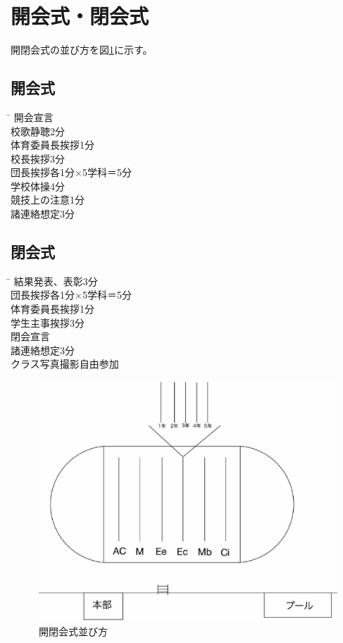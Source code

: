 \documentclass[titlepage]{jarticle}
\begin{document}
 \section{開会式・閉会式}
  開閉会式の並び方を図\ref{open_close}に示す。
  \subsection{開会式}
  \begin{center}
  \begin{tabbing}
   \hspace{8zh}\=\hspace{10zh}\kill
    開会宣言\\
    校歌静聴\>2分\\
    体育委員長挨拶\>1分\\
    校長挨拶\>3分\\
    団長挨拶\>各1分×5学科＝5分\\
    学校体操\>4分\\

    競技上の注意\>1分\\
    諸連絡想定\>3分
  \end{tabbing}
  \end{center}
  \subsection{閉会式}
  \begin{center}
  \begin{tabbing}
   \hspace{8zh}\=\hspace{10zh}\kill
    結果発表、表彰\>3分\\
    団長挨拶\>各1分×5学科＝5分\\
    体育委員長挨拶\>1分\\
    学生主事挨拶\>3分\\
    閉会宣言\\
    諸連絡想定\>3分\\
    クラス写真撮影\>自由参加
  \end{tabbing}
  \end{center}
  \begin{figure}[h]
   \centering
   \includegraphics[width=12cm]{open_close.pdf}
   \caption{開閉会式並び方}
   \label{open_close}
  \end{figure}
\end{document}
